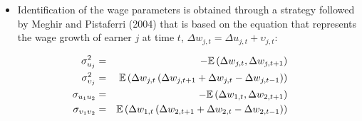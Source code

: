 \documentclass[notes=show]{beamer}
\begin{document}
\begin{frame}%



\begin{itemize}
\item Identification of the wage parameters is obtained through a strategy
followed by Meghir and Pistaferri (2004) that is based on the equation that
represents the wage growth of earner $j$ at time $t$, $\Delta w_{j,t}=\Delta
u_{j,t}+\upsilon _{j,t}$:
\end{itemize}

\begin{eqnarray}
\sigma _{u_{j}}^{2} &=&-\mathbb{E}\left( \Delta w_{j,t},\Delta
w_{j,t+1}\right) \\
\sigma _{\upsilon _{j}}^{2} &=&\mathbb{E}\left( \Delta w_{j,t}\left( \Delta
w_{j,t+1}+\Delta w_{j,t}-\Delta w_{j,t-1}\right) \right)  \notag \\
\sigma _{u_{1}u_{2}} &=&-\mathbb{E}\left( \Delta w_{1,t},\Delta
w_{2,t+1}\right)  \notag \\
\sigma _{\upsilon _{1}\upsilon _{2}} &=&\mathbb{E}\left( \Delta
w_{1,t}\left( \Delta w_{2,t+1}+\Delta w_{2,t}-\Delta w_{2,t-1}\right) \right)
\notag
\end{eqnarray}

\transboxout%
\end{frame}%

\bigskip
\end{document}
